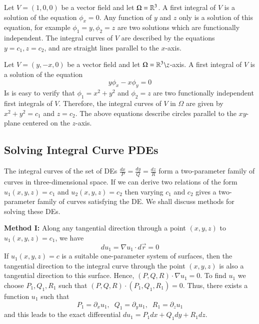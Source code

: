     \begin{example}
        Let $V = (1,0,0)$ be a vector field and let $\Omega = \mathbb R^3$. A first integral of $V$ is a solution of the equation $\phi_x = 0$. Any function of $y$ and $z$ only is a solution of this equation, for example $\phi_1 = y,\phi_2 = z$ are two solutions which are functionally independent. The integral curves of $V$ are described by the equations $y = c_1, z = c_2$, and are straight lines parallel to the $x$-axis.
    \end{example}

    \begin{example}
        Let $V = (y,-x,0)$ be a vector field and let $\Omega = \mathbb R^3\backslash z$-axis. A first integral of $V$ is a solution of the equation \begin{equation*}
            y\phi_x - x\phi_y = 0
        \end{equation*}
        Is is easy to verify that $\phi_1 = x^2+y^2$ and $\phi_2 = z$ are two functionally independent first integrals of $V$. Therefore, the integral curves of $V$ in $\Omega$ are given by $x^2+y^2=c_1$ and $z=c_2$. The above equations describe circles parallel to the $xy$-plane centered on the $z$-axis.
    \end{example}


    \subsection{Solving Integral Curve PDEs}

    The integral curves of the set of DEs $\frac{dx}{P} = \frac{dy}{Q} = \frac{dz}{R}$ form a two-parameter family of curves in three-dimensional space. If we can derive two relations of the form $u_1(x,y,z) = c_1$ and $u_2(x,y,z) = c_2$ then varying $c_1$ and $c_2$ gives a two-parameter family of curves satisfying the DE. We shall discuss methods for solving these DEs.

    \textbf{Method I:} Along any tangential direction through a point $(x,y,z)$ to $u_1(x,y,z) = c_1$, we have \begin{equation*}
        du_1 = \nabla u_1 \cdot d\vec{r} = 0
    \end{equation*}
    If $u_1(x,y,z) = c$ is a suitable one-parameter system of surfaces, then the tangential direction to the integral curve through the point $(x,y,z)$ is also a tangential direction to this surface. Hence, $(P,Q,R)\cdot \nabla u_1 = 0$. To find $u_1$ we choose $P_1,Q_1,R_1$ such that $(P,Q,R) \cdot (P_1,Q_1,R_1) = 0$. Thus, there exists a function $u_1$ such that \begin{equation*}
        P_1 = \partial_xu_1,\;\;Q_1 = \partial_yu_1,\;\;R_1 = \partial_zu_1
    \end{equation*}
    and this leads to the exact differential $du_1 = P_1dx+Q_1dy+R_1dz$.


